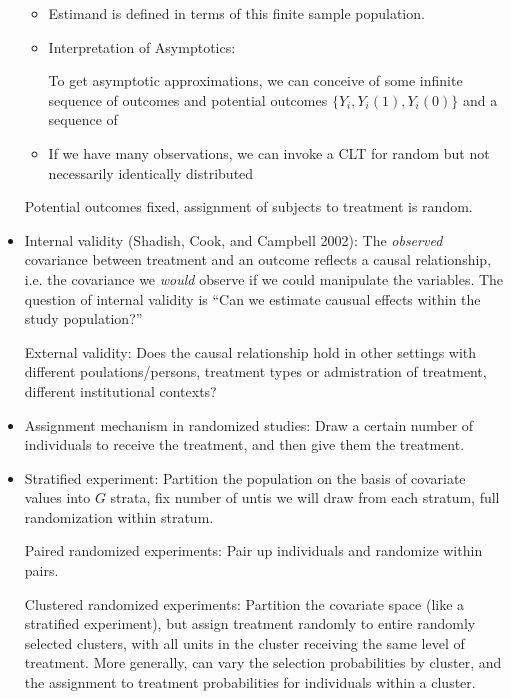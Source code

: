 \documentclass[12pt]{article}
\theoremstyle{plain}
\theoremstyle{definition}
\theoremstyle{remark}
\begin{document}
\begin{itemize}
\begin{itemize}
      \item Estimand is defined in terms of this finite sample
        population.

      \item
        Interpretation of Asymptotics:

        To get asymptotic approximations, we can conceive of some
        infinite sequence of outcomes and potential outcomes
        $\{Y_i,Y_i(1),Y_i(0)\}$ and a sequence of

      \item If we have many observations, we can invoke a CLT for random
        but not necessarily identically distributed
    \end{itemize}
    Potential outcomes fixed, assignment of subjects to treatment is
    random.

  \item Internal validity (Shadish, Cook, and Campbell 2002):
    The \emph{observed} covariance between treatment and an outcome
    reflects a causal relationship, i.e. the covariance we
    \emph{would} observe if we could manipulate the variables.
    The question  of internal validity is
    ``Can we estimate causual effects within the study population?''

    External validity:
    Does the causal relationship hold in other settings with different
    poulations/persons, treatment types or admistration of treatment,
    different institutional contexts?

  \item
    Assignment mechanism in randomized studies:
    Draw a certain number of individuals to receive the treatment, and
    then give them the treatment.

  \item
    Stratified experiment:
    Partition the population on the basis of covariate values into $G$
    strata, fix number of untis we will draw from each stratum, full
    randomization within stratum.

    Paired randomized experiments:
    Pair up individuals and randomize within pairs.

    Clustered randomized experiments:
    Partition the covariate space (like a stratified experiment), but
    assign treatment randomly to entire randomly selected clusters, with
    all units in the cluster receiving the same level of treatment.
    More generally, can vary the selection probabilities by cluster, and
    the assignment to treatment probabilities for individuals within a
    cluster.


\end{itemize}
\end{document}
